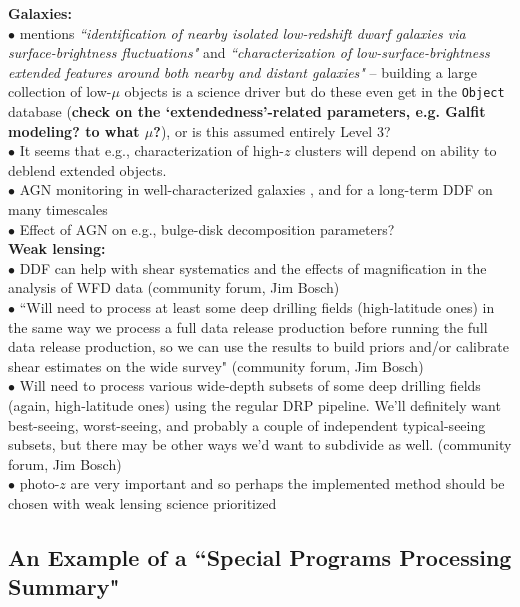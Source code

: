 \documentclass[DM,lsstdraft,toc]{lsstdoc}
\begin{document}
\noindent \textbf{Galaxies:} \\
$\bullet$ \cite{FergusonWP} mentions {\it ``identification of nearby isolated low-redshift dwarf galaxies via surface-brightness fluctuations"} and {\it ``characterization of low-surface-brightness extended features around both nearby and distant galaxies"} -- building a large collection of low-$\mu$ objects is a science driver but do these even get in the {\tt Object} database (\textbf{check on the `extendedness'-related parameters, e.g. {\sc Galfit} modeling? to what $\mu$?}), or is this assumed entirely Level 3? \\
$\bullet$ It seems that e.g., characterization of high-$z$ clusters will depend on ability to deblend extended objects. \\
$\bullet$ AGN monitoring in well-characterized galaxies \citep{FergusonWP}, and for a long-term DDF on many timescales \citep{GawiserWP} \\
$\bullet$ Effect of AGN on e.g., bulge-disk decomposition parameters? \\

\noindent \textbf{Weak lensing:} \\
$\bullet$ DDF can help with shear systematics and the effects of magnification in the analysis of WFD data (community forum, Jim Bosch) \\
$\bullet$ ``Will need to process at least some deep drilling fields (high-latitude ones) in the same way we process a full data release production before running the full data release production, so we can use the results to build priors and/or calibrate shear estimates on the wide survey" (community forum, Jim Bosch) \\
$\bullet$ Will need to process various wide-depth subsets of some deep drilling fields (again, high-latitude ones) using the regular DRP pipeline. We'll definitely want best-seeing, worst-seeing, and probably a couple of independent typical-seeing subsets, but there may be other ways we'd want to subdivide as well. (community forum, Jim Bosch)  \\
$\bullet$ photo-$z$ are very important \citep{MaWP} and so perhaps the implemented method should be chosen with weak lensing science prioritized \\


\subsection{An Example of a ``Special Programs Processing Summary"}\label{ssec:science_dmsumex}
\end{document}
